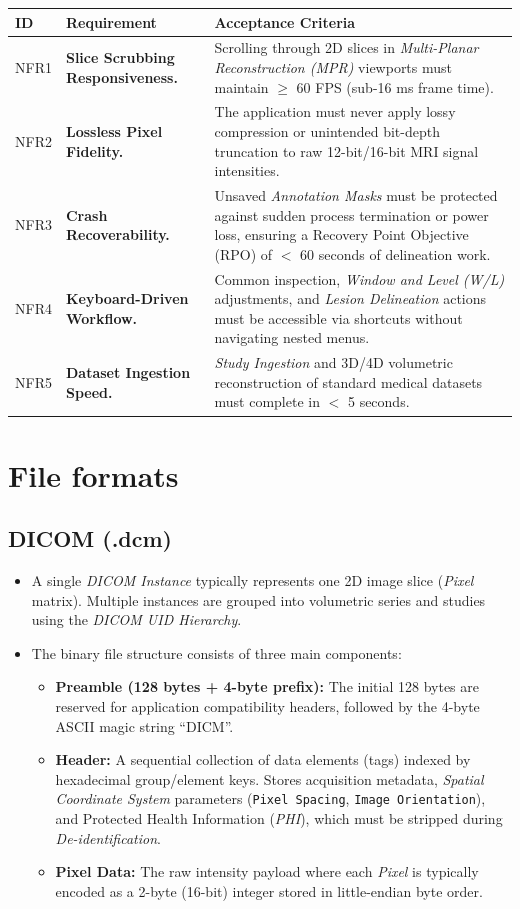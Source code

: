 \documentclass[11pt, a4paper]{article}
\begin{document}
\begin{tabularx}{\textwidth}{|l|X|X|}
\hline
ID  & Requirement & Acceptance Criteria \\ \hline
NFR1 & \textbf{Slice Scrubbing Responsiveness.} & Scrolling through 2D slices in \textit{Multi-Planar Reconstruction (MPR)} viewports must maintain $\geq$ 60 FPS (sub-16 ms frame time). \\ \hline
NFR2 & \textbf{Lossless Pixel Fidelity.} & The application must never apply lossy compression or unintended bit-depth truncation to raw 12-bit/16-bit MRI signal intensities. \\ \hline
NFR3 & \textbf{Crash Recoverability.} & Unsaved \textit{Annotation Masks} must be protected against sudden process termination or power loss, ensuring a Recovery Point Objective (RPO) of $<$ 60 seconds of delineation work. \\ \hline
NFR4 & \textbf{Keyboard-Driven Workflow.} & Common inspection, \textit{Window and Level (W/L)} adjustments, and \textit{Lesion Delineation} actions must be accessible via shortcuts without navigating nested menus. \\ \hline
NFR5 & \textbf{Dataset Ingestion Speed.} & \textit{Study Ingestion} and 3D/4D volumetric reconstruction of standard medical datasets must complete in $<$ 5 seconds. \\ \hline
\end{tabularx}

\section{File formats}

\subsection{DICOM (.dcm)}
\begin{itemize}
    \item A single \textit{DICOM Instance} typically represents one 2D image slice (\textit{Pixel} matrix). Multiple instances are grouped into volumetric series and studies using the \textit{DICOM UID Hierarchy}.
    \item The binary file structure consists of three main components:
    \begin{itemize}
        \item \textbf{Preamble (128 bytes + 4-byte prefix):} The initial 128 bytes are reserved for application compatibility headers, followed by the 4-byte ASCII magic string ``DICM''.
        \item \textbf{Header:} A sequential collection of data elements (tags) indexed by hexadecimal group/element keys. Stores acquisition metadata, \textit{Spatial Coordinate System} parameters (\texttt{Pixel Spacing}, \texttt{Image Orientation}), and Protected Health Information (\textit{PHI}), which must be stripped during \textit{De-identification}.
        \item \textbf{Pixel Data:} The raw intensity payload where each \textit{Pixel} is typically encoded as a 2-byte (16-bit) integer stored in little-endian byte order.
    \end{itemize}
\end{itemize}
\end{document}
